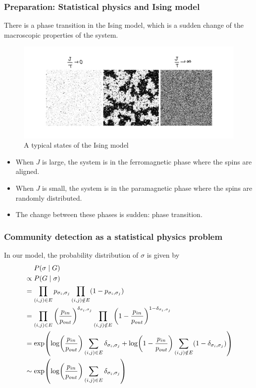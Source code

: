 \documentclass[dvipdfmx,11pt]{beamer}
\begin{document}
\begin{frame}
  \frametitle{Preparation: Statistical physics and Ising model}
  There is a \alert{phase transition} in the Ising model, which is a sudden change of the macroscopic properties of the system.
  \begin{figure}
    \centering
    \includegraphics[width=0.6\linewidth]{figure/ising.jpeg}
    \caption{A typical states of the Ising model}
  \end{figure}
  \begin{itemize}
    \item When $J$ is large, the system is in the \alert{ferromagnetic phase} where the spins are aligned.
    \item When $J$ is small, the system is in the \alert{paramagnetic phase} where the spins are randomly distributed.
    \item The change between these phases is sudden: \alert{phase transition}.
  \end{itemize}
  
\end{frame}

\begin{frame}
  \frametitle{Community detection as a statistical physics problem}
  In our model, the probability distribution of $\sigma$ is given by
  \begin{align*}
    & ~~~~ P(\sigma \mid G) \\
    &\propto P(G \mid \sigma) \\
    & = \prod_{(i, j) \in E}  p_{\sigma_i, \sigma_j} \prod_{(i, j) \notin E} (1 - p_{\sigma_i, \sigma_j}) \\
    & = \prod_{(i,j) \in E} \qty(\frac{p_{in}}{p_{out}})^{\delta_{\sigma_i, \sigma_j}} \prod_{(i, j) \notin E}   \qty(1 - \frac{p_{in}}{p_{out}})^{1 - \delta_{\sigma_i, \sigma_j}} \\
    & = \exp(\log(\frac{p_{in}}{p_{out}}) \sum_{(i, j) \in E}  \delta_{\sigma_i, \sigma_j} + \log(1 - \frac{p_{in}}{p_{out}}) \sum_{(i, j) \notin E}  (1 - \delta_{\sigma_i, \sigma_j})) \\
    & \sim \exp(\log(\frac{p_{in}}{p_{out}}) \sum_{(i, j) \in E}  \delta_{\sigma_i, \sigma_j} )
  \end{align*}
\end{frame}
\end{document}
